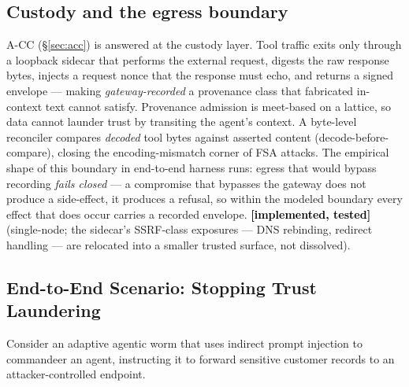 \documentclass[10pt,twocolumn,letterpaper]{article}
\newcommand{\statusimpl}[0]{\textcolor{black}{\textbf{[implemented, tested]}}}
\begin{document}
\subsection{Custody and the egress boundary}
\label{sec:custody}

A-CC (\S\ref{sec:acc}) is answered at the custody layer. Tool traffic exits
only through a loopback sidecar that performs the external request, digests
the raw response bytes, injects a request nonce that the response must echo,
and returns a signed envelope --- making \emph{gateway-recorded} a provenance
class that fabricated in-context text cannot satisfy. Provenance admission is
meet-based on a lattice, so data cannot launder trust by transiting the
agent's context. A byte-level reconciler compares \emph{decoded} tool bytes
against asserted content (decode-before-compare), closing the
encoding-mismatch corner of FSA attacks. The empirical shape of this
boundary in end-to-end harness runs: egress that would bypass recording
\emph{fails closed} --- a compromise that bypasses the gateway does not
produce a side-effect, it produces a refusal, so within the modeled boundary
every effect that does occur carries a recorded envelope. \statusimpl{}
(single-node; the sidecar's SSRF-class exposures --- DNS rebinding, redirect
handling --- are relocated into a smaller trusted surface, not dissolved).

\subsection{End-to-End Scenario: Stopping Trust Laundering}
\label{sec:e2e}

Consider an adaptive agentic worm that uses indirect prompt injection to commandeer an agent, instructing it to forward sensitive customer records to an attacker-controlled endpoint.
\end{document}
